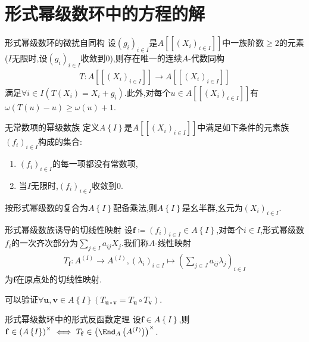 \section{形式幂级数环中的方程的解}

\begin{lemma}{形式幂级数环的微扰自同构}{}
	设$\left(g_{i}\right)_{i\in I}$是$A[[(X_{i})_{i\in I}]]$中一族阶数$\geq 2$的元素($I$无限时,设$\left(g_{i}\right)_{i\in I}$收敛到$0$),则存在唯一的连续$A$-代数同构
	\begin{align*}
		T:A[[(X_{i})_{i\in I}]]\to A[[(X_{i})_{i\in I}]]
	\end{align*}
	满足$\forall i\in I\left(T\left(X_{i}\right)=X_{i}+g_{i}\right)$.此外,对每个$u\in A[[(X_{i})_{i\in I}]]$有$\omega\left(T\left(u\right)-u\right)\geq\omega\left(u\right)+1$.
\end{lemma}

\begin{definition}{无常数项的幂级数族}{}
	定义$A\left\{I\right\}$是$A[[(X_{i})_{i\in I}]]$中满足如下条件的元素族$\left(f_{i}\right)_{i\in I}$构成的集合:
	\begin{enumerate}
		\item $\left(f_{i}\right)_{i\in I}$的每一项都没有常数项,
		\item 当$I$无限时,$\left(f_{i}\right)_{i\in I}$收敛到$0$.
	\end{enumerate}
	按形式幂级数的复合为$A\left\{I\right\}$配备乘法,则$A\left\{I\right\}$是幺半群,幺元为$(X_{i})_{i\in I}$.
\end{definition}

\begin{definition}{形式幂级数族诱导的切线性映射}{}
	设$\mathbf{f}\coloneq\left(f_{i}\right)_{i\in I}\in A\left\{I\right\}$,对每个$i\in I$,形式幂级数$f_{i}$的一次齐次部分为$\sum\limits_{j\in I}a_{ij}X_{j}$.我们称$A$-线性映射
	\begin{align*}
		T_{\mathbf{f}}:A^{\left(I\right)}\to A^{\left(I\right)},\left(\lambda_{i}\right)_{i\in I}\mapsto\left(\sum\limits_{j\in J}a_{ij}\lambda_{j}\right)_{i\in I}
	\end{align*}
	为$\mathbf{f}$在原点处的切线性映射.
\end{definition}

\begin{remark}{}{}
	可以验证$\forall\mathbf{u},\mathbf{v}\in A\left\{I\right\}\left(T_{\mathbf{u}\circ\mathbf{v}}=T_{\mathbf{u}}\circ T_{\mathbf{v}}\right)$.
\end{remark}

\begin{proposition}{形式幂级数环中的形式反函数定理}{}
	设$\mathbf{f}\in A\left\{I\right\}$,则$\mathbf{f}\in\left(A\left\{I\right\}\right)^{\times}\iff T_{\mathbf{f}}\in\left(\End_{A}\left(A^{\left(I\right)}\right)\right)^{\times}$.
\end{proposition}

